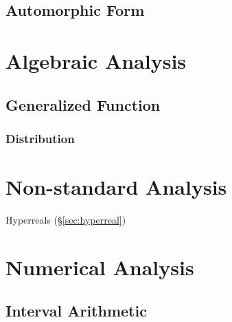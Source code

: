 \subsection{Automorphic Form}\label{sec:automorphic_form}



\section{Algebraic Analysis}\label{sec:algebraic_analysis}

\subsection{Generalized Function}\label{sec:generalized_function}

\subsubsection{Distribution}\label{sec:distribution}



\section{Non-standard Analysis}\label{sec:nonstandard_analysis}

Hyperreals (\S\ref{sec:hyperreal})



\section{Numerical Analysis}\label{sec:numerical_analysis}

\subsection{Interval Arithmetic}\label{sec:interval_arithmetic}




